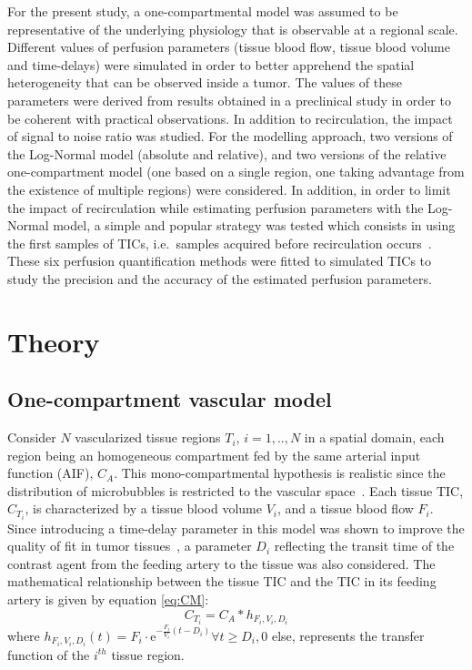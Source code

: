 For the present study, a one-compartmental model was assumed to be representative of the underlying physiology that is observable at a regional scale. Different values of perfusion parameters (tissue blood flow, tissue blood volume and time-delays) were simulated in order to better apprehend the spatial heterogeneity that can be observed inside a tumor. The values of these parameters were derived from results obtained in a preclinical study in order to be coherent with practical observations. In addition to recirculation, the impact of signal to noise ratio was  studied. For the modelling approach, two versions of the Log-Normal model (absolute and relative), and two versions of the relative one-compartment model (one based on a single region, one taking advantage from the existence of multiple regions) were considered. In addition, in order to limit the impact of recirculation while estimating perfusion parameters with the Log-Normal model, a simple and popular strategy was tested which consists in using the first samples of TICs, i.e.~samples acquired before recirculation occurs~\cite{Lowerison2017}. These six perfusion quantification methods were fitted to simulated TICs to study the precision and  the accuracy of the estimated perfusion parameters. 

\section{Theory}

\subsection{One-compartment vascular model}
\label{sec:simmdl}
Consider $N$ vascularized tissue regions $T_i$, $i=1,..,N$ in a spatial domain, each region being an homogeneous compartment fed by the same arterial input function (AIF), $C_A$. This mono-compartmental hypothesis is realistic since the distribution of microbubbles is restricted to the vascular space~\cite{Gunn:2001cx}. Each tissue TIC, $C_{T_i}$, is characterized by a tissue blood volume $V_i$, and a tissue blood flow $F_i$. Since introducing a time-delay parameter in this model was shown to improve the quality of fit in tumor tissues~\cite{Doury:2017fz}, a parameter $D_i$ reflecting the transit time of the contrast agent from the feeding artery to the tissue was also considered. 
The mathematical relationship between the tissue TIC and the TIC in its feeding artery is given by equation \ref{eq:CM}:
\begin{equation}
 C_{T_i} = C_A \ast h_{F_i,V_i,D_i}
\label{eq:CM}
\end{equation}
where $h_{F_i,V_i,D_i} (t) = F_i \cdot \mathrm{e}^{-\frac{F_i}{V_i} \left( t - D_i \right)}\forall t \geq D_i, 0$ else, represents the transfer function of the $i^{th}$ tissue region.

